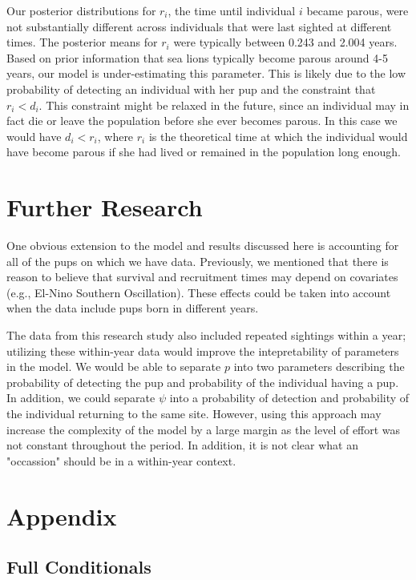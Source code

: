 \documentclass[12pt, a4paper]{article}
\begin{document}
Our posterior distributions for $r_i$, the time until individual $i$ became parous, were not substantially different across individuals that were last sighted at different times.  The posterior means for $r_i$ were typically between 0.243 and 2.004 years. Based on prior information that sea lions typically become parous around 4-5 years, our model is under-estimating this parameter. This is likely due to the low probability of detecting an individual with her pup and the constraint that $r_i < d_i$. This constraint might be relaxed in the future, since an individual may in fact die or leave the population before she ever becomes parous. In this case we would have $d_i < r_i$, where $r_i$ is the theoretical time at which the individual would have become parous if she had lived or remained in the population long enough. 

\section{Further Research}

One obvious extension to the model and results discussed here is accounting for all of the pups on which we have data. Previously, we mentioned that there is reason to believe that survival and recruitment times may depend on covariates (e.g., El-Nino Southern Oscillation). These effects could be taken into account when the data include pups born in different years. 

The data from this research study also included repeated sightings within a year; utilizing these within-year data would improve the intepretability of parameters in the model. We would be able to separate $p$ into two parameters describing the probability of detecting the pup and probability of the individual having a pup. In addition, we could separate $\psi$ into a probability of detection and probability of the individual returning to the same site. However, using this approach may increase the complexity of the model by a large margin as the level of effort was not constant throughout the period. In addition, it is not clear what an "occassion" should be in a within-year context.


\section{Appendix}

\subsection{Full Conditionals}
\end{document}
